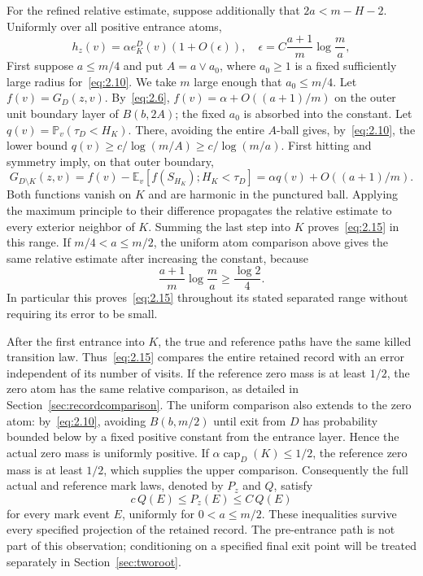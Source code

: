 \documentclass[11pt,a4paper]{article}
\numberwithin{equation}{section}
\theoremstyle{remark}
\begin{document}
For the refined relative estimate, suppose additionally that $2a<m-H-2$. Uniformly over all positive entrance atoms,
\begin{equation}\label{eq:2.15}
h_z(v)=\alpha e_K^D(v)(1+O(\epsilon)),\quad
\epsilon=C\frac{a+1}{m}\log\frac ma,
\end{equation}
First suppose $a\le m/4$ and put $A=a\vee a_0$, where $a_0\ge1$ is a fixed sufficiently large radius for~\eqref{eq:2.10}. We take $m$ large enough that $a_0\le m/4$. Let $f(v)=G_D(z,v)$. By~\eqref{eq:2.6}, $f(v)=\alpha+O((a+1)/m)$ on the outer unit boundary layer of $B(b,2A)$; the fixed $a_0$ is absorbed into the constant. Let $q(v)=\mathbb P_v(\tau_D<H_K)$. There, avoiding the entire $A$-ball gives, by~\eqref{eq:2.10}, the lower bound $q(v)\ge c/\log(m/A)\ge c/\log(m/a)$. First hitting and symmetry imply, on that outer boundary,
\[
G_{D\setminus K}(z,v)
=f(v)-\mathbb E_v[f(S_{H_K});H_K<\tau_D]
=\alpha q(v)+O((a+1)/m).
\]
Both functions vanish on $K$ and are harmonic in the punctured ball. Applying the maximum principle to their difference propagates the relative estimate to every exterior neighbor of $K$. Summing the last step into $K$ proves~\eqref{eq:2.15} in this range. If $m/4<a\le m/2$, the uniform atom comparison above gives the same relative estimate after increasing the constant, because
\[
\frac{a+1}{m}\log\frac ma\ge\frac{\log2}{4}.
\]
In particular this proves~\eqref{eq:2.15} throughout its stated separated range without requiring its error to be small.

After the first entrance into $K$, the true and reference paths have the same killed transition law. Thus~\eqref{eq:2.15} compares the entire retained record with an error independent of its number of visits. If the reference zero mass is at least $1/2$, the zero atom has the same relative comparison, as detailed in Section~\ref{sec:recordcomparison}. The uniform comparison also extends to the zero atom: by~\eqref{eq:2.10}, avoiding $B(b,m/2)$ until exit from $D$ has probability bounded below by a fixed positive constant from the entrance layer. Hence the actual zero mass is uniformly positive. If $\alpha\operatorname{cap}_D(K)\le1/2$, the reference zero mass is at least $1/2$, which supplies the upper comparison. Consequently the full actual and reference mark laws, denoted by $P_z$ and $Q$, satisfy
\[
c\,Q(E)\le P_z(E)\le C\,Q(E)
\]
for every mark event $E$, uniformly for $0<a\le m/2$. These inequalities survive every specified projection of the retained record. The pre-entrance path is not part of this observation; conditioning on a specified final exit point will be treated separately in Section~\ref{sec:tworoot}.
\end{document}
